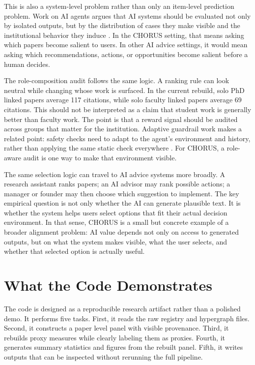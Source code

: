 \documentclass[11pt]{article}
\begin{document}
This is also a system-level problem rather than only an item-level prediction problem. Work on AI agents argues that AI systems should be evaluated not only by isolated outputs, but by the distribution of cases they make visible and the institutional behavior they induce \citep{gabriel2025ethics,tomasev2025distributional}. In the CHORUS setting, that means asking which papers become salient to users. In other AI advice settings, it would mean asking which recommendations, actions, or opportunities become salient before a human decides.

The role-composition audit follows the same logic. A ranking rule can look neutral while changing whose work is surfaced. In the current rebuild, solo PhD linked papers average 117 citations, while solo faculty linked papers average 69 citations. This should not be interpreted as a claim that student work is generally better than faculty work. The point is that a reward signal should be audited across groups that matter for the institution. Adaptive guardrail work makes a related point: safety checks need to adapt to the agent's environment and history, rather than applying the same static check everywhere \citep{luo2025agrail}. For CHORUS, a role-aware audit is one way to make that environment visible.

The same selection logic can travel to AI advice systems more broadly. A research assistant ranks papers; an AI advisor may rank possible actions; a manager or founder may then choose which suggestion to implement. The key empirical question is not only whether the AI can generate plausible text. It is whether the system helps users select options that fit their actual decision environment. In that sense, CHORUS is a small but concrete example of a broader alignment problem: AI value depends not only on access to generated outputs, but on what the system makes visible, what the user selects, and whether that selected option is actually useful.

\section{What the Code Demonstrates}

The code is designed as a reproducible research artifact rather than a polished
demo. It performs five tasks. First, it reads the raw registry and hypergraph
files. Second, it constructs a paper level panel with visible provenance. Third,
it rebuilds proxy measures while clearly labeling them as proxies. Fourth, it
generates summary statistics and figures from the rebuilt panel. Fifth, it
writes outputs that can be inspected without rerunning the full pipeline.
\end{document}
